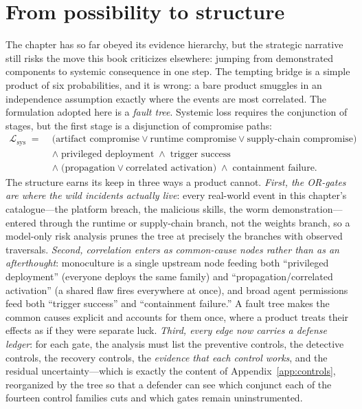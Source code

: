 \section{From possibility to structure}
\label{sec:riskchain}

The chapter has so far obeyed its evidence hierarchy, but the strategic narrative still risks the move this book criticizes elsewhere: jumping from demonstrated components to systemic consequence in one step. The tempting bridge is a simple product of six probabilities, and it is wrong: a bare product smuggles in an independence assumption exactly where the events are most correlated. The formulation adopted here is a \emph{fault tree}. Systemic loss requires the conjunction of stages, but the first stage is a disjunction of compromise paths:
\begin{align*}
\mathcal{L}_{\mathrm{sys}} \;=\;{}& \bigl(\text{artifact compromise} \lor \text{runtime compromise} \lor \text{supply-chain compromise}\bigr)\\
&\land\; \text{privileged deployment} \;\land\; \text{trigger success}\\
&\land\; \bigl(\text{propagation} \lor \text{correlated activation}\bigr) \;\land\; \text{containment failure}.
\end{align*}
The structure earns its keep in three ways a product cannot. \emph{First, the OR-gates are where the wild incidents actually live}: every real-world event in this chapter's catalogue---the platform breach, the malicious skills, the worm demonstration---entered through the runtime or supply-chain branch, not the weights branch, so a model-only risk analysis prunes the tree at precisely the branches with observed traversals. \emph{Second, correlation enters as common-cause nodes rather than as an afterthought}: monoculture is a single upstream node feeding both ``privileged deployment'' (everyone deploys the same family) and ``propagation/correlated activation'' (a shared flaw fires everywhere at once), and broad agent permissions feed both ``trigger success'' and ``containment failure.'' A fault tree makes the common causes explicit and accounts for them once, where a product treats their effects as if they were separate luck. \emph{Third, every edge now carries a defense ledger}: for each gate, the analysis must list the preventive controls, the detective controls, the recovery controls, the \emph{evidence that each control works}, and the residual uncertainty---which is exactly the content of Appendix~\ref{app:controls}, reorganized by the tree so that a defender can see which conjunct each of the fourteen control families cuts and which gates remain uninstrumented.

